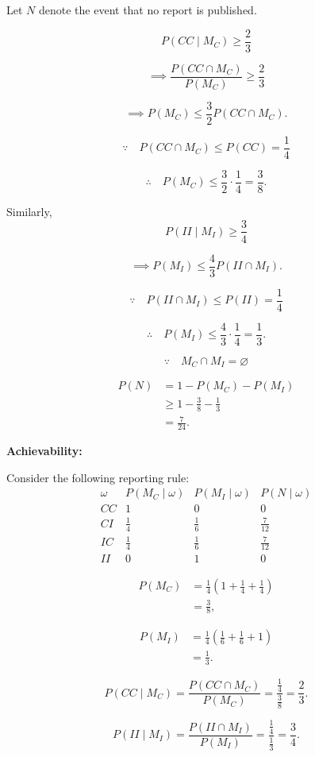 \documentclass[11pt,a4paper]{article}
\begin{document}
Let $N$ denote the event that no report is published.

\[
P(CC\mid M_C)\geq\frac23
\]

\[
\implies
\frac{P(CC\cap M_C)}{P(M_C)}
\geq\frac23
\]

\[
\implies
P(M_C)\leq\frac32P(CC\cap M_C).
\]

\[
\because\quad
P(CC\cap M_C)\leq P(CC)=\frac14
\]

\[
\therefore\quad
P(M_C)\leq\frac32\cdot\frac14=\frac38.
\]

Similarly,
\[
P(II\mid M_I)\geq\frac34
\]

\[
\implies
P(M_I)\leq\frac43P(II\cap M_I).
\]

\[
\because\quad
P(II\cap M_I)\leq P(II)=\frac14
\]

\[
\therefore\quad
P(M_I)\leq\frac43\cdot\frac14=\frac13.
\]

\[
\because\quad M_C\cap M_I=\varnothing
\]

\[
\begin{aligned}
P(N)
&=1-P(M_C)-P(M_I)\\
&\geq1-\frac38-\frac13\\
&=\frac7{24}.
\end{aligned}
\]

\textbf{Achievability:}

Consider the following reporting rule:
\[
\renewcommand{\arraystretch}{1.5}
\begin{array}{c|ccc}
\omega
&P(M_C\mid\omega)
&P(M_I\mid\omega)
&P(N\mid\omega)\\
\hline
CC&1&0&0\\
CI&\frac14&\frac16&\frac7{12}\\
IC&\frac14&\frac16&\frac7{12}\\
II&0&1&0
\end{array}
\]

\[
\begin{aligned}
P(M_C)
&=\frac14\left(1+\frac14+\frac14\right)\\
&=\frac38,
\end{aligned}
\]

\[
\begin{aligned}
P(M_I)
&=\frac14\left(\frac16+\frac16+1\right)\\
&=\frac13.
\end{aligned}
\]

\[
P(CC\mid M_C)
=\frac{P(CC\cap M_C)}{P(M_C)}
=\frac{\frac14}{\frac38}
=\frac23.
\]

\[
P(II\mid M_I)
=\frac{P(II\cap M_I)}{P(M_I)}
=\frac{\frac14}{\frac13}
=\frac34.
\]
\end{document}
